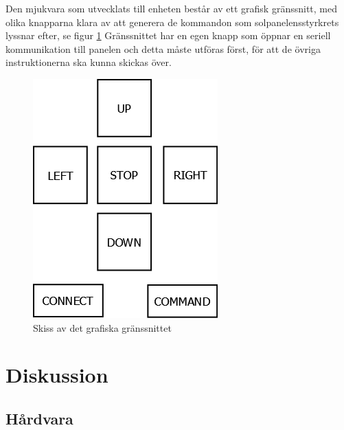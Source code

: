 \documentclass{article}
\begin{document}
        \noindent Den mjukvara som utvecklats till enheten består av ett grafisk gränssnitt, med olika knapparna klara av att generera de kommandon som solpanelens\-styrkrets lyssnar efter, se figur \ref{fig:cross} Gränssnittet har en egen knapp som öppnar en seriell kommunikation till panelen och detta måste utföras först, för att de övriga instruktionerna ska kunna skickas över. 
        \begin{figure}[b!]
            \centering
            \includegraphics[scale=0.33]{img/styrkors}
            \caption{Skiss av det grafiska gränssnittet}
            \label{fig:cross}
        \end{figure}





    \newpage

    \section{Diskussion} %
    \label{sec:diskussion}
        \subsection{Hårdvara} %
        \label{sub:d_hardvara}
        
\end{document}
